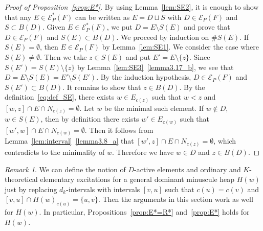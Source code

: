 \documentclass[10pt]{amsart}
\theoremstyle{definition}
\theoremstyle{remark}
\newtheorem{rema}[theo]{Remark}
\newcommand\EE{\mathcal{E}}
\begin{document}
\begin{proof}[Proof of Proposition~\ref{prop:E*}]
By using Lemma~\ref{lem:SE2}, it is enough to show that any $E \in \EE^*_P(F)$ 
can be written as $E = D \sqcup S$ with $D \in \EE_P(F)$ and $S \subset B(D)$.
Given $E \in \EE^*_P(F)$, we put $D = E \setminus S(E)$ and prove that 
$D \in \EE_P(F)$ and $S(E) \subset B(D)$.
We proceed by induction on $\# S(E)$.
If $S(E) = \emptyset$, then $E \in \EE_P(F)$ by Lemma~\ref{lem:SE1}.
We consider the case where $S(E) \neq \emptyset$.
Then we take $z \in S(E)$ and put $E' = E \setminus \{ z \}$.
Since $S(E') = S(E) \setminus \{ z \}$ by Lemma~\ref{lem:SE3}~\ref{lemma3.17_b}, 
we see that $D = E \setminus S(E) = E' \setminus S(E')$.
By the induction hypothesis, $D \in \EE_P(F)$ and $S(E') \subset B(D)$.
It remains to show that $z \in B(D)$.
By the definition~\eqref{eq:def_SE}, 
there exists $w \in E_{c(z)}$ such that $w<z$ and $[w,z] \cap E \cap N_{c(z)} = \emptyset$.
Let $w$ be the minimal such element.
If $w \not\in D$, $w \in S(E)$, 
then by definition there exists $w' \in E_{c(w)}$ such that $[w',w] \cap E \cap N_{c(w)} = \emptyset$.
Then it follows from Lemma~\ref{lem:interval}~\ref{lemma3.8_a} that $[w',z] \cap E \cap N_{c(z)} = \emptyset$, 
which contradicts to the minimality of $w$.
Therefore we have $w \in D$ and $z \in B(D)$.
\end{proof}

\begin{rema}
\label{rem:heap2}
We can define the notion of $D$-active elements and ordinary and $K$-theoretical elementary excitations 
for a general dominant minuscule heap $H(w)$ just by replacing $d_k$-intervals with 
intervals $[v,u]$ such that $c(u) = c(v)$ and $[v,u] \cap H(w)_{c(u)} = \{ u, v \}$.
Then the arguments in this section work as well for $H(w)$.
In particular, Propositions~\ref{prop:E*=R*} and~\ref{prop:E*} holds for $H(w)$.
\end{rema}
\end{document}

